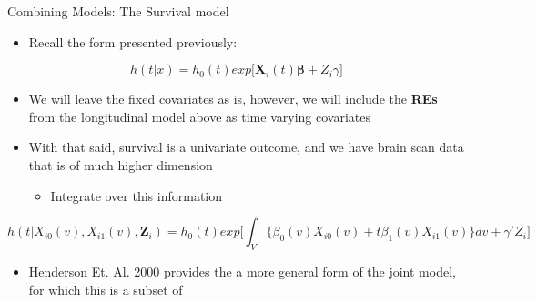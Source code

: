 \documentclass[
  ignorenonframetext,
]{beamer}
\providecommand{\tightlist}{%
  \setlength{\itemsep}{0pt}\setlength{\parskip}{0pt}}
\begin{document}
\begin{frame}{Combining Models: The Survival model}
\protect\hypertarget{combining-models-the-survival-model}{}
\begin{itemize}
\tightlist
\item
  Recall the form presented previously:
\end{itemize}

\[
h(t|x) = h_0(t)exp \Big[\boldsymbol{X}_i(t)\boldsymbol{\beta} + Z_i \gamma \Big]
\]

\begin{itemize}
\tightlist
\item
  We will leave the fixed covariates as is, however, we will include the
  \textbf{REs} from the longitudinal model above as time varying
  covariates
\item
  With that said, survival is a univariate outcome, and we have brain
  scan data that is of much higher dimension

  \begin{itemize}
  \tightlist
  \item
    Integrate over this information
  \end{itemize}
\end{itemize}

\[
h(t|X_{i0}(v), X_{i1}(v), \boldsymbol{Z}_i) = h_0(t) exp \Big[ \int_{V} \lbrace \beta_0(v)X_{i0}(v) + t\beta_1(v)X_{i1}(v)\rbrace dv + \gamma'Z_i \Big]
\]

\begin{itemize}
\tightlist
\item
  Henderson Et. Al. 2000 provides the a more general form of the joint
  model, for which this is a subset of
\end{itemize}
\end{frame}
\end{document}

